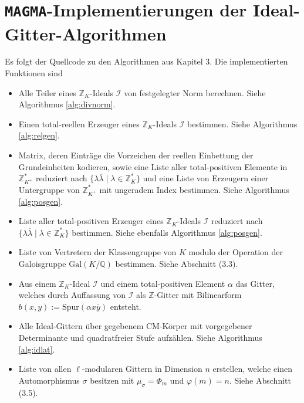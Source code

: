 \documentclass[12pt,a4paper,halfparskip,headsepline,bibtotocnumbered]{scrreprt}
\theoremstyle{nummermitklammern}
\theoremstyle{nonumberbreak}
\newcommand{\Z}{\mathbb{Z}}
\newcommand{\Q}{\mathbb{Q}}
\newcommand{\I}{\mathcal{I}}
\begin{document}
\section{\texttt{MAGMA}-Implementierungen der Ideal-Gitter-Algorithmen}
Es folgt der Quellcode zu den Algorithmen aus Kapitel 3. Die implementierten Funktionen sind
\begin{itemize}
	\item Alle Teiler eines $\Z_K$-Ideals $\I$ von festgelegter Norm berechnen. Siehe Algorithmus \eqref{alg:divnorm}.
	\item Einen total-reellen Erzeuger eines $\Z_K$-Ideals $\I$ bestimmen. Siehe Algorithmus \eqref{alg:relgen}.
	\item Matrix, deren Einträge die Vorzeichen der reellen Einbettung der Grundeinheiten kodieren, sowie eine Liste aller total-positiven Elemente in $\Z_{K^+}^\ast$ reduziert nach $\lbrace \lambda \overline{\lambda} \mid \lambda \in \Z_K^\ast \rbrace$ und eine Liste von Erzeugern einer Untergruppe von $\Z_{K^+}^\ast$ mit ungeradem Index bestimmen. Siehe Algorithmus \eqref{alg:posgen}.
	\item Liste aller total-positiven Erzeuger eines $\Z_K$-Ideals $\I$ reduziert nach $\lbrace \lambda \overline{\lambda} \mid \lambda \in \Z_K^\ast \rbrace$ bestimmen. Siehe ebenfalls Algorithmus \eqref{alg:posgen}.
	\item Liste von Vertretern der Klassengruppe von $K$ modulo der Operation der Galoisgruppe $\text{Gal}(K/\Q)$ bestimmen. Siehe Abschnitt (3.3).
	\item Aus einem $\Z_K$-Ideal $\I$ und einem total-positiven Element $\alpha$ das Gitter, welches durch Auffassung von $\I$ als $\Z$-Gitter mit Bilinearform $b(x,y) := \text{Spur}(\alpha x \overline{y})$ entsteht.
	\item Alle Ideal-Gittern über gegebenem CM-Körper mit vorgegebener Determinante und quadratfreier Stufe aufzählen. Siehe Algorithmus \eqref{alg:idlat}.
	\item Liste von allen $\ell$-modularen Gittern in Dimension $n$ erstellen, welche einen Automorphismus $\sigma$ besitzen mit $\mu_\sigma = \Phi_m$ und $\varphi(m) = n$. Siehe Abschnitt (3.5).
\end{itemize}


\newpage
\end{document}
